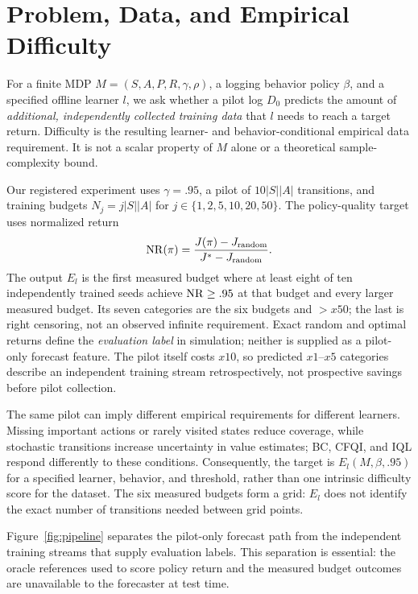 \section{Problem, Data, and Empirical Difficulty}
\label{sec:data}
For a finite MDP $M=(S,A,P,R,\gamma,\rho)$, a logging behavior policy $\beta$, and a specified offline learner $l$, we ask whether a pilot log $D_0$ predicts the amount of \emph{additional, independently collected training data} that $l$ needs to reach a target return. Difficulty is the resulting learner- and behavior-conditional empirical data requirement. It is not a scalar property of $M$ alone or a theoretical sample-complexity bound.

Our registered experiment uses $\gamma=.95$, a pilot of $10|S||A|$ transitions, and training budgets $N_j=j|S||A|$ for $j\in\{1,2,5,10,20,50\}$. The policy-quality target uses normalized return
\begin{equation}
 {\rm NR}(\pi)=\frac{J(\pi)-J_{\rm random}}{J^*-J_{\rm random}}.
 \label{eq:nr}
\end{equation}
The output $E_l$ is the first measured budget where at least eight of ten independently trained seeds achieve ${\rm NR}\geq .95$ at that budget and every larger measured budget. Its seven categories are the six budgets and $>x50$; the last is right censoring, not an observed infinite requirement. Exact random and optimal returns define the \emph{evaluation label} in simulation; neither is supplied as a pilot-only forecast feature. The pilot itself costs $x10$, so predicted $x1$--$x5$ categories describe an independent training stream retrospectively, not prospective savings before pilot collection.

The same pilot can imply different empirical requirements for different learners. Missing important actions or rarely visited states reduce coverage, while stochastic transitions increase uncertainty in value estimates; BC, CFQI, and IQL respond differently to these conditions. Consequently, the target is $E_l(M,\beta,.95)$ for a specified learner, behavior, and threshold, rather than one intrinsic difficulty score for the dataset. The six measured budgets form a grid: $E_l$ does not identify the exact number of transitions needed between grid points.

Figure~\ref{fig:pipeline} separates the pilot-only forecast path from the independent training streams that supply evaluation labels. This separation is essential: the oracle references used to score policy return and the measured budget outcomes are unavailable to the forecaster at test time.

